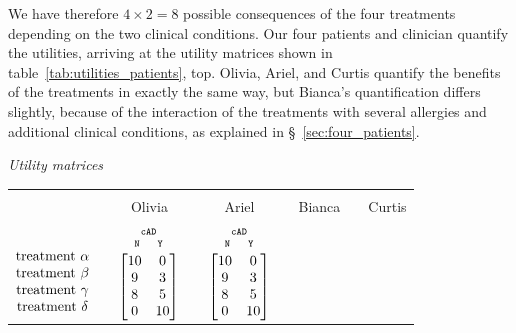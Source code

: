 \documentclass[utf8]{FrontiersinHarvard} %
\newcommand*{\sect}{\S}%
\renewcommand*{\|}[1][]{\nonscript\:#1\vert\nonscript\:\mathopen{}}
\newcommand*{\cad}{\texttt{cAD}}
\newcommand*{\yes}{\texttt{Y}}
\newcommand*{\no}{\texttt{N}}
\begin{document}
We have therefore $4 \times 2 = 8$ possible consequences of the four treatments depending on the two clinical conditions. Our four patients and clinician quantify the utilities, arriving at the utility matrices shown in table~\ref{tab:utilities_patients}, top. Olivia, Ariel, and Curtis quantify the benefits of the treatments in exactly the same way, but Bianca's quantification differs slightly, because of the interaction of the treatments with several allergies and additional clinical conditions, as explained in \sect~\ref{sec:four_patients}.

\medskip
\begin{table}[!h]
  \centering
  \textit{Utility matrices}\\
  \begin{tabular}{lccccccc}
    \hline\\[-1.5\jot]
    &{\small Olivia} &&{\small Ariel} &&{\small Bianca} &&{\small Curtis}
    \\[\jot]
    $\begin{matrix}&\\[1.5\jot]
      \text{treatment }\alpha\\ 
      \text{treatment }\beta\\ 
      \text{treatment }\gamma\\ 
      \text{treatment }\delta
    \end{matrix}$
    &
    $
    \begin{gathered}
      {\scriptstyle\cad}\\[-2\jot]
      \begin{smallmatrix}
        \no\enspace &\enspace\yes
      \end{smallmatrix}\\[-\jot]
\begin{bmatrix}10&0\\9&3\\8&5\\0&10\end{bmatrix}
\end{gathered}
$
    &&
    $\begin{gathered}
      {\scriptstyle\cad}\\[-2\jot]
      \begin{smallmatrix}
        \no\enspace &\enspace\yes
      \end{smallmatrix}\\[-\jot]
      \begin{bmatrix}10&0\\9&3\\8&5\\0&10\end{bmatrix}\end{gathered}$

\end{tabular}
\end{table}
\end{document}
